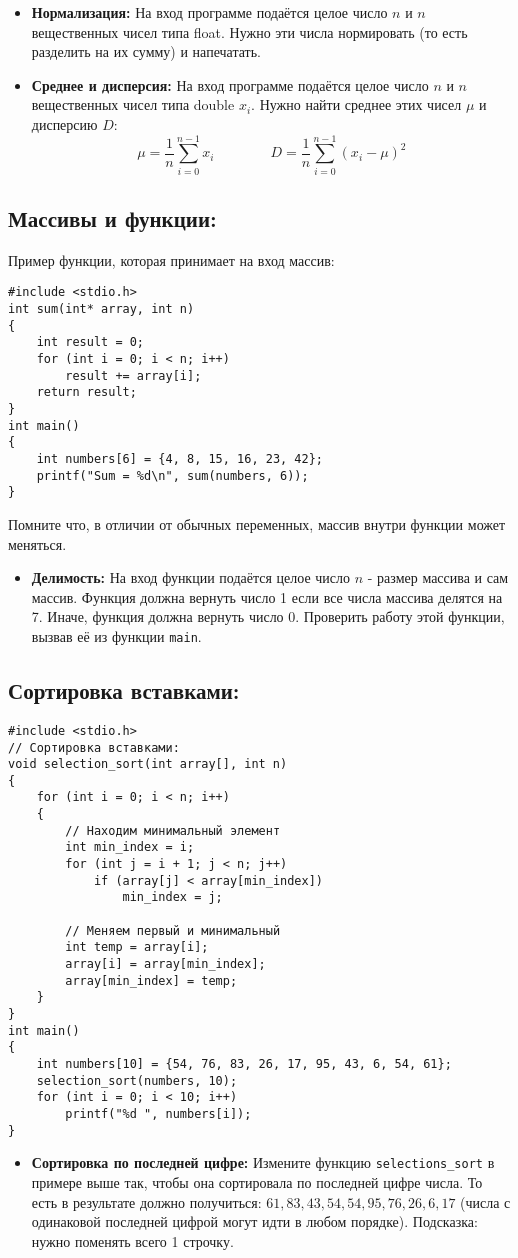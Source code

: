 \documentclass{article}
\begin{document}
\begin{itemize}

\item \textbf{Нормализация:} На вход программе подаётся целое число $n$ и $n$ вещественных чисел типа float. Нужно эти числа нормировать (то есть разделить на их сумму) и напечатать.
\item \textbf{Среднее и дисперсия:} На вход программе подаётся целое число $n$ и $n$ вещественных чисел типа double ${x_i}$. Нужно найти среднее этих чисел $\mu$ и дисперсию $D$: 
$$\mu = \frac{1}{n}\sum_{i=0}^{n-1}x_i \quad \quad \quad \quad D = \frac{1}{n}\sum_{i=0}^{n-1}(x_i - \mu)^2$$
\end{itemize}

\subsection*{Массивы и функции:}
Пример функции, которая принимает на вход массив:
\begin{lstlisting}
#include <stdio.h>
int sum(int* array, int n)
{
	int result = 0;
	for (int i = 0; i < n; i++)
		result += array[i];
	return result;
}
int main()
{
	int numbers[6] = {4, 8, 15, 16, 23, 42};
	printf("Sum = %d\n", sum(numbers, 6));
}
\end{lstlisting}
Помните что, в отличии от обычных переменных, массив внутри функции может меняться.
\begin{itemize}
\item \textbf{Делимость:} На вход функции подаётся целое число $n$ - размер массива и сам массив. Функция должна вернуть число 1 если все числа массива делятся на 7. Иначе, функция должна вернуть число 0. Проверить работу этой функции, вызвав её из функции \texttt{main}.
\end{itemize}

\newpage
\subsection*{Сортировка вставками:}
\begin{lstlisting}
#include <stdio.h>
// Сортировка вставками:
void selection_sort(int array[], int n)
{
	for (int i = 0; i < n; i++)
	{
		// Находим минимальный элемент
		int min_index = i;
		for (int j = i + 1; j < n; j++)
			if (array[j] < array[min_index])
				min_index = j;
				
		// Меняем первый и минимальный
		int temp = array[i];
		array[i] = array[min_index];
		array[min_index] = temp;
	}
}
int main()
{
	int numbers[10] = {54, 76, 83, 26, 17, 95, 43, 6, 54, 61};
	selection_sort(numbers, 10);
	for (int i = 0; i < 10; i++)
		printf("%d ", numbers[i]);
}
\end{lstlisting}
\begin{itemize}
\item \textbf{Сортировка по последней цифре:} Измените функцию \texttt{selections\_sort} в примере выше так, чтобы она сортировала по последней цифре числа. То есть в результате должно получиться: $61, 83, 43, 54, 54, 95, 76, 26, 6, 17$ (числа с одинаковой последней цифрой могут идти в любом порядке). Подсказка: нужно поменять всего 1 строчку.
\end{itemize}
\end{document}
